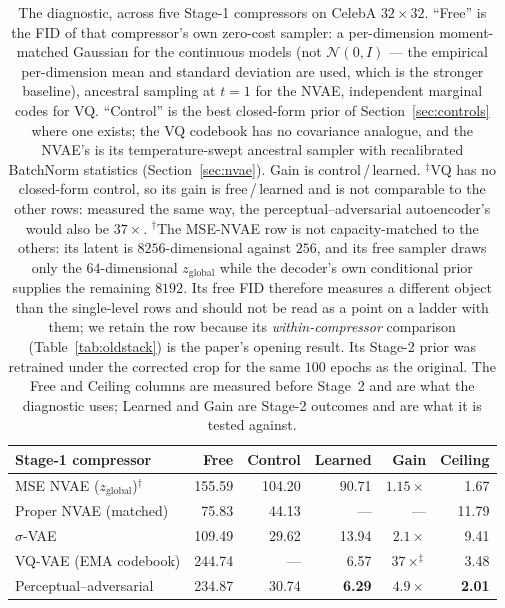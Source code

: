 \documentclass[sigconf,nonacm]{acmart}
\newcommand{\zg}{z_{\mathrm{global}}}
\newcommand{\best}[1]{\textbf{#1}}
\begin{document}
\begin{table}[t]
\caption{The diagnostic, across five Stage-1 compressors on CelebA
$32{\times}32$. ``Free'' is the FID of that compressor's own zero-cost sampler: a
per-dimension moment-matched Gaussian for the continuous models (not
$\mathcal{N}(0,I)$ --- the empirical per-dimension mean and standard deviation
are used, which is the stronger baseline), ancestral sampling at $t{=}1$ for the
NVAE, independent marginal codes for VQ. ``Control'' is the best closed-form
prior of Section~\ref{sec:controls} where one exists; the VQ codebook has no
covariance analogue, and the NVAE's is its temperature-swept ancestral sampler
with recalibrated BatchNorm statistics (Section~\ref{sec:nvae}). Gain is
control\,/\,learned. $^\ddagger$VQ has no closed-form control, so its gain is
free\,/\,learned and is not comparable to the other rows: measured the same way,
the perceptual--adversarial autoencoder's would also be $37\times$. $^\dagger$The MSE-NVAE row is not capacity-matched to the
others: its latent is $8256$-dimensional against $256$, and its free sampler
draws only the $64$-dimensional $\zg$ while the decoder's own conditional prior
supplies the remaining $8192$. Its free FID therefore measures a different
object than the single-level rows and should not be read as a point on a ladder
with them; we retain the row because its \emph{within-compressor} comparison
(Table~\ref{tab:oldstack}) is the paper's opening result. Its Stage-2 prior was retrained
under the corrected crop for the same $100$ epochs as the original. The Free and Ceiling columns are measured before Stage~2 and
are what the diagnostic uses; Learned and Gain are Stage-2 outcomes and are what
it is tested against.}
\label{tab:diagnostic}
\small
\begin{tabular}{lrrrrr}
\toprule
Stage-1 compressor & Free & Control & Learned & Gain & Ceiling \\
\midrule
MSE NVAE ($\zg$)$^\dagger$ & 155.59 & 104.20 & 90.71 & $1.15\times$ & 1.67 \\
Proper NVAE (matched)     & 75.83  & 44.13 & ---   & ---         & 11.79 \\
$\sigma$-VAE              & 109.49 & 29.62 & 13.94 & $2.1\times$ & 9.41 \\
VQ-VAE (EMA codebook)     & 244.74 & ---   & 6.57  & $37\times^\ddagger$ & 3.48 \\
Perceptual--adversarial   & 234.87 & 30.74 & \best{6.29}  & \best{$4.9\times$} & \best{2.01} \\
\bottomrule
\end{tabular}
\end{table}
\end{document}
